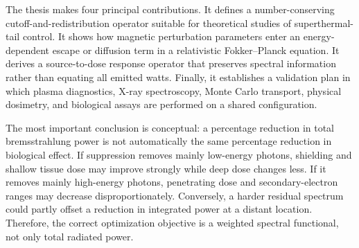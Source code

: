 \documentclass[12pt,oneside]{report}
\theoremstyle{definition}
\begin{document}
The thesis makes four principal contributions. It defines a number-conserving cutoff-and-redistribution operator suitable for theoretical studies of superthermal-tail control. It shows how magnetic perturbation parameters enter an energy-dependent escape or diffusion term in a relativistic Fokker--Planck equation. It derives a source-to-dose response operator that preserves spectral information rather than equating all emitted watts. Finally, it establishes a validation plan in which plasma diagnostics, X-ray spectroscopy, Monte Carlo transport, physical dosimetry, and biological assays are performed on a shared configuration.

The most important conclusion is conceptual: a percentage reduction in total bremsstrahlung power is not automatically the same percentage reduction in biological effect. If suppression removes mainly low-energy photons, shielding and shallow tissue dose may improve strongly while deep dose changes less. If it removes mainly high-energy photons, penetrating dose and secondary-electron ranges may decrease disproportionately. Conversely, a harder residual spectrum could partly offset a reduction in integrated power at a distant location. Therefore, the correct optimization objective is a weighted spectral functional, not only total radiated power.
\clearpage

\tableofcontents
\listoftables
\listoffigures
\clearpage
\end{document}
